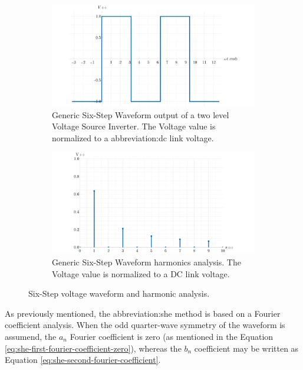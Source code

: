 \documentclass[a4paper, twoside, 11pt]{article}
\begin{document}
            \begin{figure}[htbp!]
                \centering
                \begin{subfigure}[t]{0.45\textwidth}
                    \includegraphics[width=1\textwidth]{src/png/SixStepPlotWaveform.png}
                    \caption{Generic Six-Step Waveform output of a two level Voltage Source Inverter. The Voltage value is normalized to a \gls{abbreviation:dc} link voltage.}
                    \label{fig:SixStepPlotWaveform}
                \end{subfigure}
                \hspace{0.05\textwidth}
                \begin{subfigure}[t]{0.45\textwidth}
                    \includegraphics[width=1\textwidth]{src/png/SixStepPlotHarmonics.png}
                    \caption{Generic Six-Step Waveform harmonics analysis. The Voltage value is normalized to a DC link voltage.}
                    \label{fig:SixStepPlotHarmonics}
                \end{subfigure}
                \caption{Six-Step voltage waveform and harmonic analysis.}
            \end{figure}
            \FloatBarrier
            As previously mentioned, the \gls{abbreviation:she} method is based on a Fourier coefficient analysis. When the odd quarter-wave symmetry of the waveform is assumend, the $a_n$ Fourier coefficient is zero (as mentioned in the Equation \ref{eq:she-first-fourier-coefficient-zero}), whereas the $b_n$ coefficient may be written as Equation \ref{eq:she-second-fourier-coefficient}.
\end{document}
